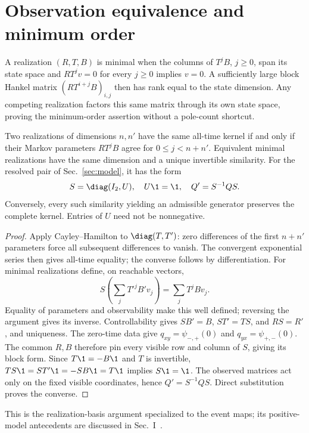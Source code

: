 \section{Observation equivalence and minimum order}\label{app:realization}
A realization $(R,T,B)$ is minimal when the columns of $T^jB$, $j\ge0$, span its state space and $RT^jv=0$ for every $j\ge0$ implies $v=0$. A sufficiently large block Hankel matrix $(RT^{i+j}B)_{i,j}$ then has rank equal to the state dimension. Any competing realization factors this same matrix through its own state space, proving the minimum-order assertion without a pole-count shortcut.

\begin{lemma}\label{lem:orbit}
Two realizations of dimensions $n,n'$ have the same all-time kernel if and only if their Markov parameters $RT^jB$ agree for $0\le j<n+n'$. Equivalent minimal realizations have the same dimension and a unique invertible similarity. For the resolved pair of Sec.~\ref{sec:model}, it has the form
\begin{equation}
 S=\diag(I_2,U),\quad U\1=\1,\quad Q'=S^{-1}QS.\label{eq:orbit}
\end{equation}
Conversely, every such similarity yielding an admissible generator preserves the complete kernel. Entries of $U$ need not be nonnegative.
\end{lemma}
\begin{proof}
Apply Cayley--Hamilton to $\diag(T,T')$: zero differences of the first $n+n'$ parameters force all subsequent differences to vanish. The convergent exponential series then gives all-time equality; the converse follows by differentiation. For minimal realizations define, on reachable vectors,
\begin{equation}
 S\left(\sum_jT'^jB'v_j\right)=\sum_jT^jBv_j.
\end{equation}
Equality of parameters and observability make this well defined; reversing the argument gives its inverse. Controllability gives $SB'=B$, $ST'=TS$, and $RS=R'$, and uniqueness. The zero-time data give $q_{xy}=\psi_{-,+}(0)$ and $q_{yx}=\psi_{+,-}(0)$. The common $R,B$ therefore pin every visible row and column of $S$, giving its block form. Since $T\1=-B\1$ and $T$ is invertible, $TS\1=ST'\1=-SB\1=T\1$ implies $S\1=\1$. The observed matrices act only on the fixed visible coordinates, hence $Q'=S^{-1}QS$. Direct substitution proves the converse.
\end{proof}
This is the realization-basis argument specialized to the event maps; its positive-model antecedents are discussed in Sec.~I~\cite{Vanluyten2008,HorvathTelek2007}.


